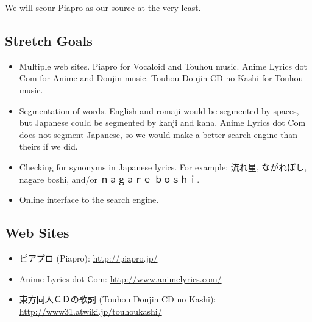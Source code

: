 \documentclass[a4paper]{article}
\begin{document}
\begin{CJK}{UTF8}{zhsong}
We will scour Piapro as our source at the very least.
\subsection*{Stretch Goals}
\begin{itemize}
\item Multiple web sites. Piapro for Vocaloid and Touhou music. Anime Lyrics dot Com for Anime and Doujin music. Touhou Doujin CD no Kashi for Touhou music.
\item Segmentation of words. English and romaji would be segmented by spaces, but Japanese could be segmented by kanji and kana. Anime Lyrics dot Com does not segment Japanese, so we would make a better search engine than theirs if we did.
\item Checking for synonyms in Japanese lyrics. For example: 流れ星, ながれぼし, nagare boshi, and/or ｎａｇａｒｅ ｂｏｓｈｉ.
\item Online interface to the search engine.
\end{itemize}
\subsection*{Web Sites}
\begin{itemize}
\item ピアプロ (Piapro): \url{http://piapro.jp/}
\item Anime Lyrics dot Com: \url{http://www.animelyrics.com/}
\item 東方同人ＣＤの歌詞 (Touhou Doujin CD no Kashi): \url{http://www31.atwiki.jp/touhoukashi/}
\end{itemize}
\end{CJK}
\end{document}
